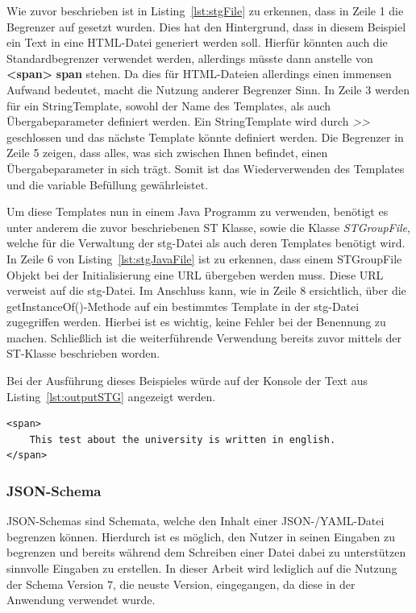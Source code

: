 Wie zuvor beschrieben ist in Listing~\ref{lst:stgFile} zu erkennen, dass in Zeile 1 die Begrenzer auf \textit{{}} gesetzt wurden.
Dies hat den Hintergrund, dass in diesem Beispiel ein Text in eine HTML-Datei generiert werden soll.
Hierfür könnten auch die Standardbegrenzer verwendet werden, allerdings müsste dann anstelle von \textbf{<span>} \textbf{\<span\>} stehen.
Da dies für HTML-Dateien allerdings einen immensen Aufwand bedeutet, macht die Nutzung anderer Begrenzer Sinn.
In Zeile 3 werden für ein StringTemplate, sowohl der Name des Templates, als auch Übergabeparameter definiert werden.
Ein StringTemplate wird durch \textit{>>} geschlossen und das nächste Template könnte definiert werden.
Die Begrenzer in Zeile 5 zeigen, dass alles, was sich zwischen Ihnen befindet, einen Übergabeparameter in sich trägt.
Somit ist das Wiederverwenden des Templates und die variable Befüllung gewährleistet.

Um diese Templates nun in einem Java Programm zu verwenden, benötigt es unter anderem die zuvor beschriebenen ST Klasse, sowie
die Klasse \textit{STGroupFile}, welche für die Verwaltung der stg-Datei als auch deren Templates benötigt wird.
In Zeile 6 von Listing~\ref{lst:stgJavaFile} ist zu erkennen, dass einem STGroupFile Objekt bei der Initialisierung eine URL übergeben werden muss.
Diese URL verweist auf die stg-Datei.
Im Anschluss kann, wie in Zeile 8 ersichtlich, über die getInstanceOf()-Methode auf ein bestimmtes Template in der stg-Datei zugegriffen werden.
Hierbei ist es wichtig, keine Fehler bei der Benennung zu machen.
Schließlich ist die weiterführende Verwendung bereits zuvor mittels der ST-Klasse beschrieben worden.



Bei der Ausführung dieses Beispieles würde auf der Konsole der Text aus Listing~\ref{lst:outputSTG} angezeigt werden.

\begin{lstlisting}[label={lst:outputSTG}]
<span>
    This test about the university is written in english.
</span>
\end{lstlisting}

\subsubsection{JSON-Schema}\label{subsubsec:json-schema}
JSON-Schemas sind Schemata, welche den Inhalt einer JSON-/YAML-Datei begrenzen können.
Hierdurch ist es möglich, den Nutzer in seinen Eingaben zu begrenzen und bereits während dem Schreiben einer Datei dabei zu unterstützen sinnvolle Eingaben zu erstellen.
In dieser Arbeit wird lediglich auf die Nutzung der Schema Version 7, die neuste Version, eingegangen, da diese in der Anwendung verwendet wurde.

